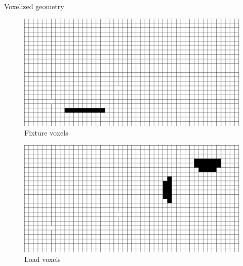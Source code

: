 \begin{frame}{Voxelized geometry}
\hfill
\begin{minipage}{0.49\textwidth}
\begin{figure}
\includegraphics[width=.8\textwidth]{Pictures/Voxels/Fixture.pdf}
\caption{Fixture voxels}
\end{figure}
\vspace{-0.6cm}
\begin{figure}
\includegraphics[width=.8\textwidth]{Pictures/Voxels/Load.pdf}
\caption{Load voxels}
\end{figure}
\end{minipage}
\end{frame}

